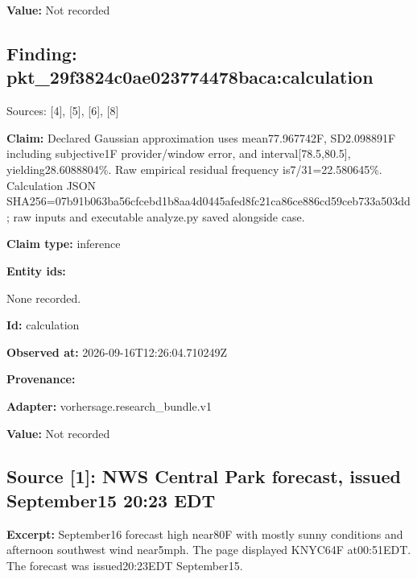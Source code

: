 \documentclass[11pt]{article}
\begin{document}
\par\noindent\textbf{Value:} Not recorded

\subsection*{\textcolor{epdarkgreen}{Finding: pkt\_29f3824c\hspace{0pt}0ae023774478\hspace{0pt}baca:calcula\hspace{0pt}tion}}
Sources: [4], [5], [6], [8]


\par\noindent\textbf{Claim:} Declared Gaussian approximation uses mean77.967742F, SD2.098891F including subjective1F provider/window error, and interval[78.5,80.5], yielding28.6088804\%. Raw empirical residual frequency is7/31=22.580645\%. Calculation JSON SHA256=07b91\hspace{0pt}b063ba56cfce\hspace{0pt}bd1b8aa4d044\hspace{0pt}5afed8fc21ca\hspace{0pt}86ce886cd59c\hspace{0pt}eb733a503dd; raw inputs and executable analyze.py saved alongside case.

\par\noindent\textbf{Claim type:} inference

\par\noindent\textbf{Entity ids:} \par None recorded.

\par\noindent\textbf{Id:} calculation

\par\noindent\textbf{Observed at:} 2026-09-16T12:26:04.710249Z

\par\noindent\textbf{Provenance:} \par \par\noindent\textbf{Adapter:} vorhersage.r\hspace{0pt}esearch\_bund\hspace{0pt}le.v1

\par\noindent\textbf{Value:} Not recorded

\subsection*{\textcolor{epdarkgreen}{Source [1]: NWS Central Park forecast, issued September15 20:23 EDT}}
\par\noindent\textbf{Excerpt:} September16 forecast high near80F with mostly sunny conditions and afternoon southwest wind near5mph. The page displayed KNYC64F at00:51EDT. The forecast was issued20:23EDT September15.
\end{document}
